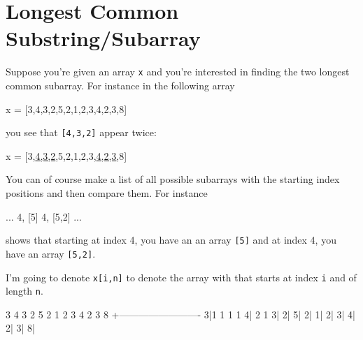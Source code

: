 \section{Longest Common Substring/Subarray}
 

Suppose you're given an array \verb!x! and you're interested in finding 
the two longest common subarray.
For instance in the following array
\begin{console}
x = [3,4,3,2,5,2,1,2,3,4,2,3,8]
\end{console}
you see that \verb![4,3,2]! appear twice:
\begin{console}[commandchars=\\\{\}]
x = [3,\underline{4,3,2},5,2,1,2,3,\underline{4,2,3},8]
\end{console}

You can of course make a list of all possible subarrays with
the starting index positions and then compare them.
For instance
\begin{console}
...
4, [5]
4, [5,2]
...
\end{console}
shows that starting at index 4, you have an an array \verb![5]!
and at index 4, you have an array \verb![5,2]!.

I'm going to denote \verb!x[i,n]! to denote the array
with that starts at index \verb!i! and of length \verb!n!.


\begin{console}
  3 4 3 2 5 2 1 2 3 4 2 3 8
 +-------------------------
3|1   1           1     1
4|  2               1
3|
2|
5|
2|
1|
2|
3|
4|
2|
3|
8|
\end{console}
